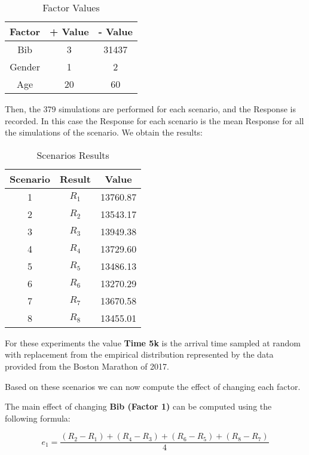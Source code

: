 \documentclass[11pt, oneside]{article}   	%
\begin{document}
\begin{table}[H]
\caption{Factor Values}
\begin{center}
 \begin{tabular}{|c|c|c|}
 \hline
  Factor & + Value & - Value \\
  \hline \hline
  Bib & 3 & 31437 \\ 
  Gender & 1 & 2 \\
  Age & 20 & 60\\
 \hline
\end{tabular}
\end{center}
\label{table: factor values}
\end{table}

Then, the 379 simulations are performed for each scenario, and the Response is recorded. In this case the Response for each scenario is the mean Response for all the simulations of the scenario. We obtain the results:

\begin{table}[H]
\caption{Scenarios Results}
\begin{center}
 \begin{tabular}{|c|c|c|}
 \hline
  Scenario & Result & Value \\
  \hline \hline
  1 & $R_1$ & 13760.87 \\ 
  2 & $R_2$ & 13543.17 \\
  3 & $R_3$ & 13949.38 \\
   4 & $R_4$ & 13729.60 \\
   5 & $R_5$ & 13486.13 \\
   6 & $R_6$ & 13270.29 \\
   7 & $R_7$ & 13670.58 \\
   8 & $R_8$ & 13455.01 \\
 \hline
\end{tabular}
\end{center}
\label{table: scenarios results}
\end{table}

For these experiments the value \textbf{Time 5k} is the arrival time sampled at random with replacement from the empirical distribution represented by the data provided from the Boston Marathon of 2017.

Based on these scenarios we can now compute the effect of changing each factor. 

The main effect of changing \textbf{Bib (Factor 1)} can be computed using the following formula:

$$e_1 = \dfrac{(R_2 - R_1) + (R_4 - R_3) + (R_6 - R_5) + (R_8 - R_7)}{4}$$
\end{document}
